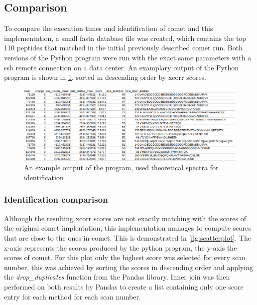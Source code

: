 \documentclass[11pt]{article}
\begin{document}
\subsection{Comparison}
To compare the execution times and identification of comet and this implementation, a small fasta database file was created, which contains the top 110 peptides that matched in the initial previously described comet run. Both versions of the Python program were run with the exact same parameters with a ssh remote connection on a data center.
An examplary output of the Python program is shown in \cref{fig:output}, sorted in descending order by xcorr scores.
\begin{figure}[ht]
\centering
\includegraphics[width=1\textwidth]{figs/output.png}
\caption{An example output of the program, used theoretical spectra for identification}
\label{fig:output}
\end{figure}

\subsubsection{Identification comparison}
Although the resulting xcorr scores are not exactly matching with the scores of the original comet implentation, this implementation manages to compute scores that are close to the ones in comet. This is demonstrated in \cref{fig:scatterplot}. The x-axis represents the scores produced by the python program, the y-axis the scores of comet. For this plot only the highest score was selected for every scan number, this was achieved by sorting the scores in descending order and applying the \textit{drop\_duplicates} function from the Pandas library. Inner join was then performed on both results by Pandas to create a list containing only one score entry for each method for each scan number. 
\end{document}
